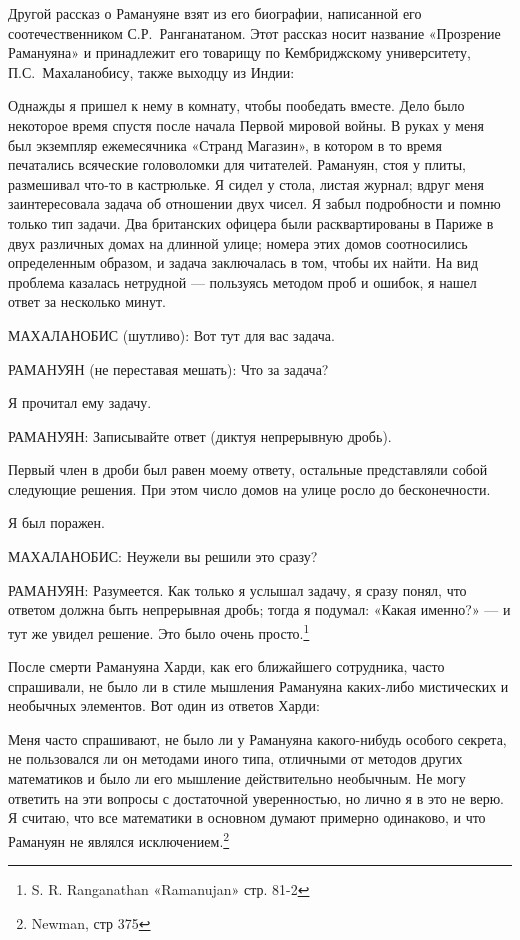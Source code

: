 \documentclass[../main.tex]{subfiles}
\begin{document}
Другой рассказ о Рамануяне взят из его биографии, написанной его соотечественником С.Р.~Ранганатаном. Этот рассказ носит название «Прозрение Рамануяна» и принадлежит его товарищу по Кембриджскому университету, П.С.~Махаланобису, также выходцу из Индии:

Однажды я пришел к нему в комнату, чтобы пообедать вместе. Дело было некоторое время спустя после начала Первой мировой войны. В руках у меня был экземпляр ежемесячника «Странд Магазин», в котором в то время печатались всяческие головоломки для читателей. Рамануян, стоя у плиты, размешивал что-то в кастрюльке. Я сидел у стола, листая журнал; вдруг меня заинтересовала задача об отношении двух чисел. Я забыл подробности и помню только тип задачи. Два британских офицера были расквартированы в Париже в двух различных домах на длинной улице; номера этих домов соотносились определенным образом, и задача заключалась в том, чтобы их найти. На вид проблема казалась нетрудной --- пользуясь методом проб и ошибок, я нашел ответ за несколько минут.

МАХАЛАНОБИС (шутливо): Вот тут для вас задача.

РАМАНУЯН (не переставая мешать): Что за задача?

Я прочитал ему задачу.

РАМАНУЯН: Записывайте ответ (диктуя непрерывную дробь).

Первый член в дроби был равен моему ответу, остальные представляли собой следующие решения. При этом число домов на улице росло до бесконечности.

Я был поражен.

МАХАЛАНОБИС: Неужели вы решили это сразу?

РАМАНУЯН: Разумеется. Как только я услышал задачу, я сразу понял, что ответом должна быть непрерывная дробь; тогда я подумал: «Какая именно?» --- и тут же увидел решение. Это было очень просто.\footnote{S. R. Ranganathan «Ramanujan» стр. 81-2}

После смерти Рамануяна Харди, как его ближайшего сотрудника, часто спрашивали, не было ли в стиле мышления Рамануяна каких-либо мистических и необычных элементов. Вот один из ответов Харди:

Меня часто спрашивают, не было ли у Рамануяна какого-нибудь особого секрета, не пользовался ли он методами иного типа, отличными от методов других математиков и было ли его мышление действительно необычным. Не могу ответить на эти вопросы с достаточной уверенностью, но лично я в это не верю. Я считаю, что все математики в основном думают примерно одинаково, и что Рамануян не являлся исключением.\footnote{Newman, стр 375}
\end{document}
